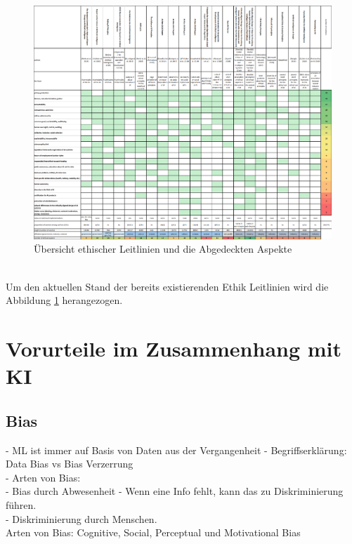 \begin{onehalfspace}
        \begin{figure}[h]
            \centering
            \includegraphics[width = \textwidth]{Bilder/Ethical huidelines hagendorf 2020.png}
            \caption{Übersicht ethischer Leitlinien und die Abgedeckten Aspekte \cite{Hagendorff2020}}
            \label{fig:EthikGuidelines}
        \end{figure} \\
        Um den aktuellen Stand der bereits existierenden Ethik Leitlinien wird die Abbildung \ref*{fig:EthikGuidelines} herangezogen.\cite{Hagendorff2020} \cite{jobin2019global}

    \newpage
    \section{Vorurteile im Zusammenhang mit \ac{KI}}
    \label{subsec:KIundbias}
    \subsection{Bias}
    \label{subsubsec:Bias}
        - ML ist immer auf Basis von Daten aus der Vergangenheit 
        -   Begriffserklärung: Data Bias vs Bias Verzerrung\\
        -   Arten von Bias: \\
            -   Bias durch Abwesenheit - Wenn eine Info fehlt, kann das zu Diskriminierung führen. \\
            -   Diskriminierung durch Menschen. \\
        Arten von Bias: Cognitive, Social, Perceptual und Motivational Bias \cite{HEGKI2019Definition}\cite{Parkavi2018} \cite{Fabi2022}


\end{onehalfspace}

